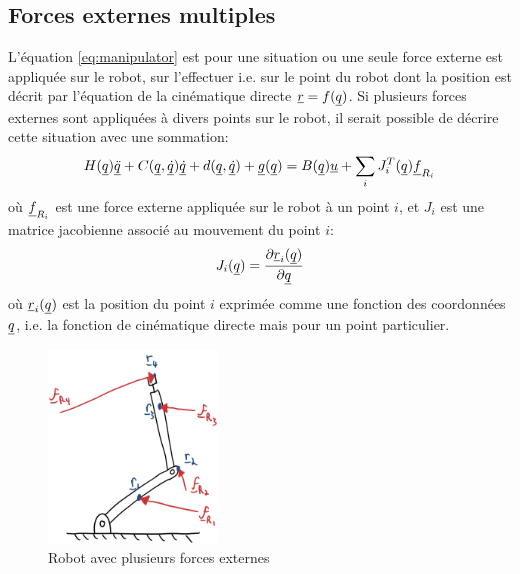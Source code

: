 

\subsection{Forces externes multiples}

L'équation \eqref{eq:manipulator} est pour une situation ou une seule force externe est appliquée sur le robot, sur l'effectuer i.e. sur le point du robot dont la position est décrit par l'équation de la cinématique directe $\underline{r} = f(\underline{q})$. Si plusieurs forces externes sont appliquées à divers points sur le robot, il serait possible de décrire cette situation avec une sommation:
\begin{align}
H(\underline{q}) \underline{\ddot{q}} + C(\underline{q},\underline{\dot{q}}) \underline{\dot{q}} + d(\underline{q}, \underline{\dot{q}}) + \underline{g}(\underline{q}) = B(\underline{q}) \underline{u}  + \sum_i J_i^T(\underline{q}) \underline{f}_{R_i} 
\end{align}
où $\underline{f}_{R_i}$ est une force externe appliquée sur le robot à un point $i$, et $J_i$ est une matrice jacobienne associé au mouvement du point $i$:
\begin{align}
J_i(\underline{q}) = \frac{ \partial \underline{r}_i(\underline{q}) }{ \partial \underline{q} }
\end{align}
où $\underline{r}_i(\underline{q})$ est la position du point $i$ exprimée comme une fonction des coordonnées $\underline{q}$, i.e. la fonction de cinématique directe mais pour un point particulier. 

\begin{figure}[H]
	\centering
		\includegraphics[width=0.40\textwidth]{fig/multipleexternalforces.jpg}
	\caption{Robot avec plusieurs forces externes}%
	\label{fig:multipleexternalforces}
\end{figure}






